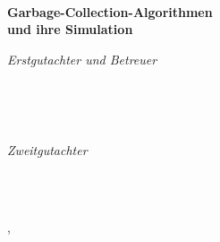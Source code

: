 \begin{titlepage}
	\vfill
	
	\centering
	
	{\large \thesisSubject} \\[5mm]
	{\huge \color{ctcolortitle}\textbf{Garbage-Collection-Algorithmen \\ und ihre Simulation} \\[10mm]}
	{\LARGE \thesisName}

	\vfill
	\begin{minipage}[t]{.4\textwidth}
		\raggedleft
		\textit{Erstgutachter und Betreuer}
	\end{minipage}
	\hspace*{15pt}
	\begin{minipage}[t]{.45\textwidth}
		{\Large \thesisFirstReviewer} \\
	\end{minipage} \\[0mm]
	\begin{minipage}[t]{.4\textwidth}
		\raggedleft
		\textit{Zweitgutachter}
	\end{minipage}
	\hspace*{15pt}
	\begin{minipage}[t]{.45\textwidth}
		{\Large \thesisSecondReviewer} \\
	\end{minipage} \\[10mm]

	\thesisAuthorCity, \thesisDate \\

\end{titlepage}


